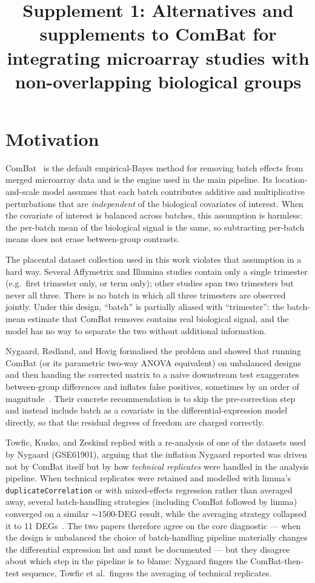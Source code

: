 \documentclass[11pt,a4paper]{article}
\title{Supplement 1: Alternatives and supplements to ComBat for
  integrating microarray studies with non-overlapping
  biological groups}
\author{}
\date{}
\begin{document}
\maketitle

\section*{Motivation}

ComBat~\cite{johnson2007} is the default empirical-Bayes method for
removing batch effects from merged microarray data and is the engine
used in the main pipeline. Its location-and-scale model assumes that
each batch contributes additive and multiplicative perturbations that
are \emph{independent} of the biological covariates of interest. When
the covariate of interest is balanced across batches, this assumption
is harmless: the per-batch mean of the biological signal is the same,
so subtracting per-batch means does not erase between-group
contrasts.

The placental dataset collection used in this work violates that
assumption in a hard way. Several Affymetrix and Illumina studies
contain only a single trimester (e.g.\ first trimester only, or term
only); other studies span two trimesters but never all three.
There is no batch in which all three trimesters are observed jointly.
Under this design, ``batch'' is partially aliased with ``trimester'':
the batch-mean estimate that ComBat removes contains real biological
signal, and the model has no way to separate the two without
additional information.

Nygaard, R{\o}dland, and Hovig formalised the problem and showed
that running ComBat (or its parametric two-way ANOVA equivalent) on
unbalanced designs and then handing the corrected matrix to a naive
downstream test exaggerates between-group differences and inflates
false positives, sometimes by an order of magnitude~\cite{nygaard2016}.
Their concrete recommendation is to skip the pre-correction step and
instead include batch as a covariate in the differential-expression
model directly, so that the residual degrees of freedom are charged
correctly.

Towfic, Kusko, and Zeskind replied with a re-analysis of one of the
datasets used by Nygaard (GSE61901), arguing that the inflation
Nygaard reported was driven not by ComBat itself but by how
\emph{technical replicates} were handled in the analysis pipeline.
When technical replicates were retained and modelled with limma's
\texttt{duplicateCorrelation} or with mixed-effects regression
rather than averaged away, several batch-handling strategies
(including ComBat followed by limma) converged on a similar
$\sim\!1500$-DEG result, while the averaging strategy collapsed it
to 11 DEGs~\cite{towfic2017}. The two papers therefore agree on the
core diagnostic --- when the design is unbalanced the choice of
batch-handling pipeline materially changes the differential
expression list and must be documented --- but they disagree about
which step in the pipeline is to blame: Nygaard fingers the
ComBat-then-test sequence, Towfic et al.\ fingers the averaging of
technical replicates.
\end{document}
